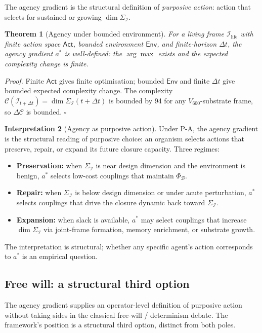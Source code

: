 \documentclass[11pt]{article}
\theoremstyle{plain}
\newtheorem{theorem}{Theorem}[section]
\theoremstyle{definition}
\newtheorem{interpretation}[theorem]{Interpretation}
\theoremstyle{remark}
\newcommand{\Ical}{\mathcal{I}}
\newcommand{\Ccal}{\mathcal{C}}
\newcommand{\Bcal}{\mathcal{B}}
\newcommand{\Ilife}{\Ical_{\mathrm{life}}}
\begin{document}
The agency gradient is the structural definition of \emph{purposive action}: action that selects for sustained or growing $\dim \Sigma_\Ical$.

\begin{theorem}[Agency under bounded environment]\label{thm:agency-existence}
For a living frame $\Ilife$ with finite action space $\mathsf{Act}$, bounded environment $\mathsf{Env}$, and finite-horizon $\Delta t$, the agency gradient $a^*$ is well-defined: the $\arg\max$ exists and the expected complexity change is finite.
\end{theorem}

\noindent\emph{Proof.} Finite $\mathsf{Act}$ gives finite optimisation; bounded $\mathsf{Env}$ and finite $\Delta t$ give bounded expected complexity change. The complexity $\Ccal(\Ical_{t + \Delta t}) = \dim \Sigma_\Ical(t + \Delta t)$ is bounded by 94 for any $V_{600}$-substrate frame, so $\Delta \Ccal$ is bounded. \hfill$\square$

\begin{interpretation}[Agency as purposive action]\label{int:agency}
Under P-A, the agency gradient is the structural reading of purposive choice: an organism selects actions that preserve, repair, or expand its future closure capacity. Three regimes:
\begin{itemize}[leftmargin=2em]
\item \textbf{Preservation:} when $\Sigma_\Ical$ is near design dimension and the environment is benign, $a^*$ selects low-cost couplings that maintain $\Phi_\Bcal$.
\item \textbf{Repair:} when $\Sigma_\Ical$ is below design dimension or under acute perturbation, $a^*$ selects couplings that drive the closure dynamic back toward $\Sigma_\Ical$.
\item \textbf{Expansion:} when slack is available, $a^*$ may select couplings that increase $\dim \Sigma_\Ical$ via joint-frame formation, memory enrichment, or substrate growth.
\end{itemize}
The interpretation is structural; whether any specific agent's action corresponds to $a^*$ is an empirical question.
\end{interpretation}

\subsection{Free will: a structural third option}\label{sec:free-will}

The agency gradient supplies an operator-level definition of purposive action without taking sides in the classical free-will / determinism debate. The framework's position is a structural third option, distinct from both poles.
\end{document}
